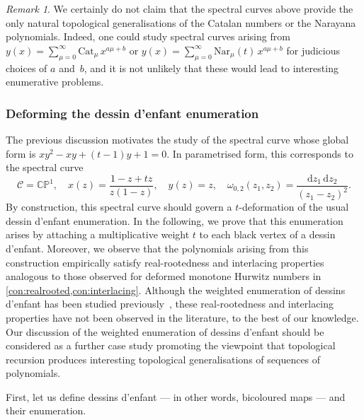 \documentclass[a4paper]{article}
\theoremstyle{plain}
\numberwithin{theorem}{section}
\theoremstyle{definition}
\theoremstyle{remark}
\newtheorem{remark}[theorem]{Remark}
\newcommand{\dd}{\mathrm{d}}
\begin{document}
\begin{remark}
We certainly do not claim that the spectral curves above provide the only natural topological generalisations of the Catalan numbers or the Narayana polynomials. Indeed, one could study spectral curves arising from $y(x) = \sum_{\mu=0}^\infty \mathrm{Cat}_\mu \, x^{a\mu+b}$ or $y(x) = \sum_{\mu=0}^\infty \mathrm{Nar}_\mu(t) \, x^{a\mu+b}$ for judicious choices of $a$ and~$b$, and it is not unlikely that these would lead to interesting enumerative problems.
\end{remark}



\subsubsection*{Deforming the dessin d'enfant enumeration}

The previous discussion motivates the study of the spectral curve whose global form is
$x y^2 - x y + (t-1)y + 1 = 0$. In parametrised form, this corresponds to the spectral curve
\[
\mathcal{C} = \mathbb{CP}^1, \quad x(z) = \frac{1-z+tz}{z(1-z)}, \quad y(z) = z, \quad \omega_{0,2}(z_1, z_2) = \frac{\dd z_1 \, \dd z_2}{(z_1 - z_2)^2}.
\]
By construction, this spectral curve should govern a $t$-deformation of the usual dessin d'enfant enumeration. In the following, we prove that this enumeration arises by attaching a multiplicative weight $t$ to each black vertex of a dessin d'enfant. Moreover, we observe that the polynomials arising from this construction empirically satisfy real-rootedness and interlacing properties analogous to those observed for deformed monotone Hurwitz numbers in \cref{con:realrooted,con:interlacing}. Although the weighted enumeration of dessins d'enfant has been studied previously~\cite{kaz-zog15}, these real-rootedness and interlacing properties have not been observed in the literature, to the best of our knowledge. Our discussion of the weighted enumeration of dessins d'enfant should be considered as a further case study promoting the viewpoint that topological recursion produces interesting topological generalisations of sequences of polynomials.


First, let us define dessins d'enfant --- in other words, bicoloured maps --- and their enumeration.
\end{document}
